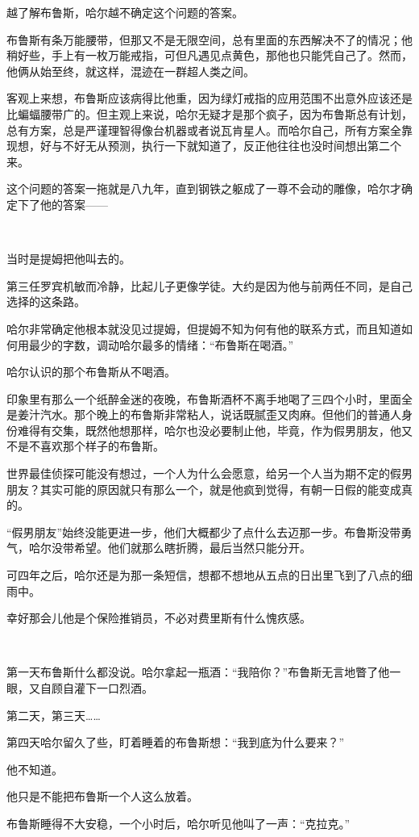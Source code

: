 \documentclass[../main]{subfiles}
\begin{document}
越了解布鲁斯，哈尔越不确定这个问题的答案。

布鲁斯有条万能腰带，但那又不是无限空间，总有里面的东西解决不了的情况；他稍好些，手上有一枚万能戒指，可但凡遇见点黄色，那他也只能凭自己了。然而，他俩从始至终，就这样，混迹在一群超人类之间。

客观上来想，布鲁斯应该病得比他重，因为绿灯戒指的应用范围不出意外应该还是比蝙蝠腰带广的。但主观上来说，哈尔无疑才是那个疯子，因为布鲁斯总有计划，总有方案，总是严谨理智得像台机器或者说瓦肯星人。而哈尔自己，所有方案全靠现想，好与不好无从预测，执行一下就知道了，反正他往往也没时间想出第二个来。

这个问题的答案一拖就是八九年，直到钢铁之躯成了一尊不会动的雕像，哈尔才确定下了他的答案——

~\

当时是提姆把他叫去的。

第三任罗宾机敏而冷静，比起儿子更像学徒。大约是因为他与前两任不同，是自己选择的这条路。

哈尔非常确定他根本就没见过提姆，但提姆不知为何有他的联系方式，而且知道如何用最少的字数，调动哈尔最多的情绪：“布鲁斯在喝酒。”

哈尔认识的那个布鲁斯从不喝酒。

印象里有那么一个纸醉金迷的夜晚，布鲁斯酒杯不离手地喝了三四个小时，里面全是姜汁汽水。那个晚上的布鲁斯非常粘人，说话既腻歪又肉麻。但他们的普通人身份难得有交集，既然他想那样，哈尔也没必要制止他，毕竟，作为假男朋友，他又不是不喜欢那个样子的布鲁斯。

世界最佳侦探可能没有想过，一个人为什么会愿意，给另一个人当为期不定的假男朋友？其实可能的原因就只有那么一个，就是他疯到觉得，有朝一日假的能变成真的。

“假男朋友”始终没能更进一步，他们大概都少了点什么去迈那一步。布鲁斯没带勇气，哈尔没带希望。他们就那么瞎折腾，最后当然只能分开。

可四年之后，哈尔还是为那一条短信，想都不想地从五点的日出里飞到了八点的细雨中。

幸好那会儿他是个保险推销员，不必对费里斯有什么愧疚感。

~\

第一天布鲁斯什么都没说。哈尔拿起一瓶酒：“我陪你？”布鲁斯无言地瞥了他一眼，又自顾自灌下一口烈酒。

第二天，第三天……

第四天哈尔留久了些，盯着睡着的布鲁斯想：“我到底为什么要来？”

他不知道。

他只是不能把布鲁斯一个人这么放着。

布鲁斯睡得不大安稳，一个小时后，哈尔听见他叫了一声：“克拉克。”
\end{document}
